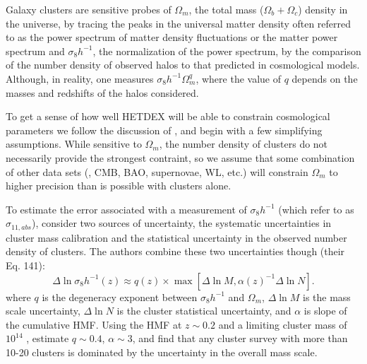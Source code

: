 \documentclass[fleqn,usenatbib]{mnras}
\newcommand{\editorial}[1]{\textcolor{red}{#1}}
\begin{document}

Galaxy clusters are sensitive probes of $\Omega_m$, the total mass ($\Omega_b + \Omega_c$) density in the universe, by tracing the peaks in the universal matter density often referred to as the power spectrum of matter density fluctuations or the matter power spectrum and $\sigma_8h^{-1}$, the normalization of the power spectrum, by the comparison of the number density of observed halos to that predicted in cosmological models. Although, in reality, one measures $\sigma_8h^{-1}\Omega_m^q$, where the value of $q$ depends on the masses and redshifts of the halos considered.

To get a sense of how well HETDEX will be able to constrain cosmological parameters we follow the discussion of \cite{Weinberg2013}, and begin with a few simplifying assumptions. While sensitive to $\Omega_m$, the number density of clusters do not necessarily provide the strongest contraint, so we assume that some combination of other data sets (\eg, CMB, BAO, supernovae, WL, etc.) will constrain $\Omega_m$ to higher precision than is possible with clusters alone. 

To estimate the error associated with a measurement of $\sigma_8h^{-1}$ (which \citealt{Weinberg2013} refer to as $\sigma_{11,abs}$), \cite{Weinberg2013} consider two sources of uncertainty, the systematic uncertainties in cluster mass calibration and the statistical uncertainty in the observed number density of clusters. The authors combine these two uncertainties though (their Eq. 141):
\begin{equation}
\Delta \ln \sigma_8h^{-1}(z) \approx q(z)\times 
        \max\left[ \Delta \ln M, \alpha(z)^{-1} \Delta \ln N \right].
\label{eq:sigElapprox}
\end{equation}
where $q$ is the degeneracy exponent between $\sigma_8h^{-1}$ and $\Omega_m$, $\Delta \ln M$ is the mass scale uncertainty, $\Delta \ln N$ is the cluster statistical uncertainty, and $\alpha$ is slope of the cumulative HMF. Using the \cite{Tinker2008} HMF at $z\sim0.2$ and a limiting cluster mass of $10^{14}$ \Msol, \cite{Weinberg2013} estimate $q\sim0.4$, $\alpha\sim3$, and find that any cluster survey with more than 10-20 clusters is dominated by the uncertainty in the overall mass scale.
\end{document}
